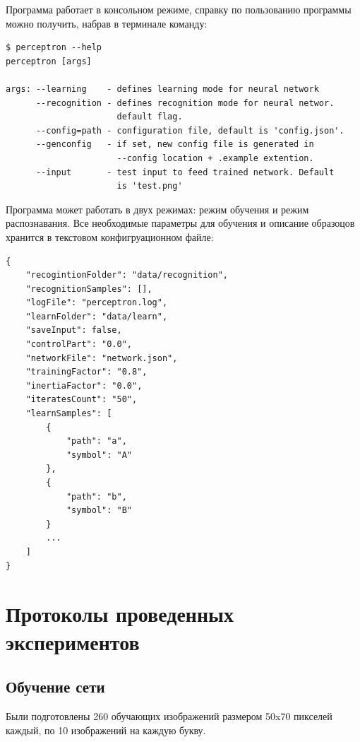 \documentclass[russian,utf8,emptystyle]{eskdtext}
\begin{document}
Программа работает в консольном режиме, справку по пользованию программы можно получить, набрав в терминале команду:
\begin{verbatim}
$ perceptron --help
perceptron [args]

args: --learning    - defines learning mode for neural network
      --recognition - defines recognition mode for neural networ.
                      default flag.
      --config=path - configuration file, default is 'config.json'.
      --genconfig   - if set, new config file is generated in 
                      --config location + .example extention.
      --input       - test input to feed trained network. Default
                      is 'test.png'
\end{verbatim}

Программа может работать в двух режимах: режим обучения и режим распознавания. Все необходимые параметры для обучения и описание образоцов хранится в текстовом конфигруационном файле:
\begin{lstlisting}
{
	"recogintionFolder": "data/recognition",
	"recognitionSamples": [],
	"logFile": "perceptron.log",
	"learnFolder": "data/learn",
	"saveInput": false,
	"controlPart": "0.0",
	"networkFile": "network.json",
	"trainingFactor": "0.8",
	"inertiaFactor": "0.0",
	"iteratesCount": "50",
	"learnSamples": [
		{
			"path": "a",
			"symbol": "A"
		},
		{
			"path": "b",
			"symbol": "B"
		}
		... 
	]
}
\end{lstlisting}

\section{Протоколы проведенных экспериментов}
\subsection{Обучение сети}
Были подготовлены 260 обучающих изображений размером 50x70 пикселей каждый, по 10 изображений на каждую букву.
\end{document}
